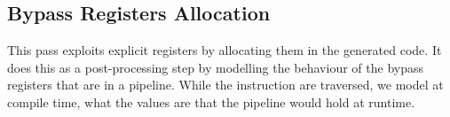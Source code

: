 \subsection{Bypass Registers Allocation}
This pass exploits explicit registers by allocating them in the generated code. It does this as a post-processing step by modelling the behaviour of the bypass registers that are in a pipeline. %
While the instruction are traversed, we model at compile time, what the values are that the pipeline would hold at runtime.











